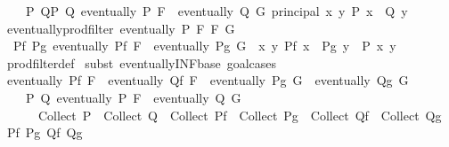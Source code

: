 \begin{isabellebody}
\ \ \ \ {\isacharparenleft}{\kern0pt}{\isasymSqinter}{\isacharparenleft}{\kern0pt}P{\isacharcomma}{\kern0pt}\ Q{\isacharparenright}{\kern0pt}{\isasymin}{\isacharbraceleft}{\kern0pt}{\isacharparenleft}{\kern0pt}P{\isacharcomma}{\kern0pt}\ Q{\isacharparenright}{\kern0pt}{\isachardot}{\kern0pt}\ eventually\ P\ F\ {\isasymand}\ eventually\ Q\ G{\isacharbraceright}{\kern0pt}{\isachardot}{\kern0pt}\ principal\ {\isacharbraceleft}{\kern0pt}{\isacharparenleft}{\kern0pt}x{\isacharcomma}{\kern0pt}\ y{\isacharparenright}{\kern0pt}{\isachardot}{\kern0pt}\ P\ x\ {\isasymand}\ Q\ y{\isacharbraceright}{\kern0pt}{\isacharparenright}{\kern0pt}{\isachardoublequoteclose}\isanewline
\isanewline
{}\isamarkupfalse%
\ eventually{\isacharunderscore}{\kern0pt}prod{\isacharunderscore}{\kern0pt}filter{\isacharcolon}{\kern0pt}\ {\isachardoublequoteopen}eventually\ P\ {\isacharparenleft}{\kern0pt}F\ {\isasymtimes}\isactrlsub F\ G{\isacharparenright}{\kern0pt}\ {\isasymlongleftrightarrow}\isanewline
\ \ {\isacharparenleft}{\kern0pt}{\isasymexists}Pf\ Pg{\isachardot}{\kern0pt}\ eventually\ Pf\ F\ {\isasymand}\ eventually\ Pg\ G\ {\isasymand}\ {\isacharparenleft}{\kern0pt}{\isasymforall}x\ y{\isachardot}{\kern0pt}\ Pf\ x\ {\isasymlongrightarrow}\ Pg\ y\ {\isasymlongrightarrow}\ P\ {\isacharparenleft}{\kern0pt}x{\isacharcomma}{\kern0pt}\ y{\isacharparenright}{\kern0pt}{\isacharparenright}{\kern0pt}{\isacharparenright}{\kern0pt}{\isachardoublequoteclose}\isanewline
%
\isadelimproof
\ \ %
\endisadelimproof
%
\isatagproof
{}\isamarkupfalse%
\ prod{\isacharunderscore}{\kern0pt}filter{\isacharunderscore}{\kern0pt}def\isanewline
{}\isamarkupfalse%
\ {\isacharparenleft}{\kern0pt}subst\ eventually{\isacharunderscore}{\kern0pt}INF{\isacharunderscore}{\kern0pt}base{\isacharcomma}{\kern0pt}\ goal{\isacharunderscore}{\kern0pt}cases{\isacharparenright}{\kern0pt}\isanewline
\ \ \isamarkupfalse%
\ {}\isanewline
\ \ \isamarkupfalse%
\ \isamarkupfalse%
\ {\isachardoublequoteopen}eventually\ Pf\ F\ {\isasymLongrightarrow}\ eventually\ Qf\ F\ {\isasymLongrightarrow}\ eventually\ Pg\ G\ {\isasymLongrightarrow}\ eventually\ Qg\ G\ {\isasymLongrightarrow}\isanewline
\ \ \ \ {\isasymexists}P\ Q{\isachardot}{\kern0pt}\ eventually\ P\ F\ {\isasymand}\ eventually\ Q\ G\ {\isasymand}\isanewline
\ \ \ \ \ \ Collect\ P\ {\isasymtimes}\ Collect\ Q\ {\isasymsubseteq}\ Collect\ Pf\ {\isasymtimes}\ Collect\ Pg\ {\isasyminter}\ Collect\ Qf\ {\isasymtimes}\ Collect\ Qg{\isachardoublequoteclose}\ \ Pf\ Pg\ Qf\ Qg\isanewline

\end{isabellebody}
